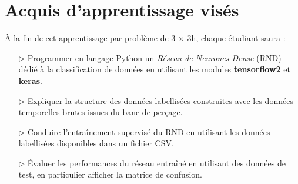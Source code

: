 \documentclass[11pt,french]{article}
\begin{document}

\renewcommand{\ttdefault}[0]{lmtt}
\newcommand{\boldtt}[1]{{\ttfamily\bfseries #1}}

\newcommand{\QtLogo}[0]{\texttt{[image: Images/QtLogo.projet]}}
\newcommand{\PyQt}[0]{\boldtt{PyQt5}}
\newcommand{\Qt}[0]{\boldtt{Qt}}

\begin{center}
\setlength{\fboxsep}{5mm}
\setlength{\fboxrule}{0.2mm}

\medskip
{}
\end{center}

\section*{Acquis d'apprentissage visés}

À la fin de cet apprentissage par problème de 3 $\times$ 3h, chaque étudiant saura :
\begin{itemize}
\item[$\rhd$] Programmer en langage Python un {\em Réseau de Neurones Dense} (RND) dédié à la classification de données
  en utilisant les modules \boldtt{tensorflow2} et \boldtt{keras}.
\item[$\rhd$] Expliquer la structure des données labellisées construites avec les données temporelles brutes issues du banc de perçage.
\item[$\rhd$] Conduire l'entraînement supervisé du RND en utilisant les données labellisées disponibles dans un fichier CSV.
\item[$\rhd$] Évaluer les performances du réseau entraîné en utilisant des données de test, en particulier afficher la matrice de confusion.
\end{itemize}

\newpage
\vspace*{-16mm}
\end{document}
